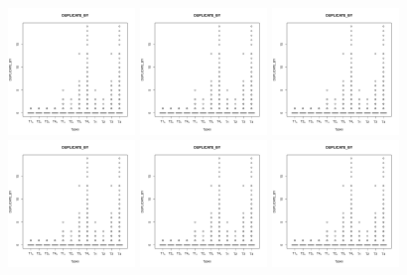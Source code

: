 \begin{figure}
\centering
\includegraphics[page=1, width=0.30\textwidth]{extract/Rplots}
\includegraphics[page=2, width=0.30\textwidth]{extract/Rplots}
\includegraphics[page=3, width=0.30\textwidth]{extract/Rplots} \\
\includegraphics[page=4, width=0.30\textwidth]{extract/Rplots}
\includegraphics[page=5, width=0.30\textwidth]{extract/Rplots}
\includegraphics[page=6, width=0.30\textwidth]{extract/Rplots} \\

\end{figure}
